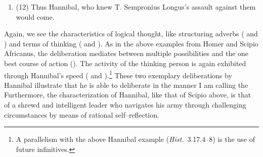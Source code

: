 \documentclass[12pt,letterpaper,oneside,final]{memoir}
\begin{document}
\begin{enumerate}
\item (12) Thus Hannibal, who knew T. Sempronius Longus's assault against them would come. \end{enumerate} \DoubleSpacing Again, we see the characteristics of logical thought, like structuring adverbs ( and ) and terms of thinking (  and ). As in the above examples from Homer and Scipio Africanus, the deliberation mediates between multiple possibilities and the one best course of action (). The activity of the thinking person is again exhibited through Hannibal's speed ( and ).\footnote{A parallelism with the above Hannibal example (\emph{Hist.}~3.17.4–8) is the use of future infinitives.} These two exemplary deliberations by Hannibal illustrate that he is able to deliberate in the manner I am calling the  Furthermore, the characterization of Hannibal, like that of Scipio above, is that of a shrewd and intelligent leader who navigates his army through challenging circumstances by means of rational self--reflection.
\end{document}
